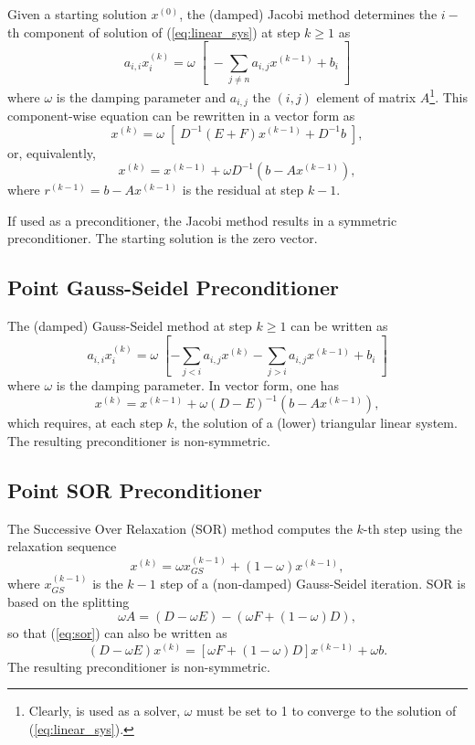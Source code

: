 Given a starting solution $x^{(0)}$, the (damped) Jacobi method determines 
the $i-$th component of 
solution of (\ref{eq:linear_sys}) at step $k \geq 1$ as
\[
a_{i,i} x^{(k)}_i = \omega \; \left[  \;- \sum_{j \neq n} a_{i,j} x^{(k-1)} + b_i
\; \right]
\]
where $\omega$ is the damping parameter and
$a_{i,j}$ the $(i,j)$ element of matrix $A$\footnote{Clearly, is used as a
  solver, $\omega$ must be set to 1 to converge to the solution of
    (\ref{eq:linear_sys}).}.
This component-wise equation can be rewritten in a vector form as
\[
x^{(k)} = \omega \; \left[ \; D^{-1} (E+F) x ^{(k-1)} + D^{-1} b \; \right],
\]
or, equivalently,
\begin{equation}
\label{eq:jacobi}
x^{(k)} = x^{(k-1)} + \omega D^{-1} (b - A x ^{(k-1)} ) ,
\end{equation}
where $r^{(k-1)} = b - A x ^{(k-1)}$ is the residual at step $k-1$. 

If used as a preconditioner, the Jacobi method results in
a symmetric preconditioner.
The starting solution is the zero vector.

\subsection{Point Gauss-Seidel Preconditioner}
\label{sec:gs}

The (damped) Gauss-Seidel method at step $k \geq 1$ can be written as
\[
a_{i,i} x^{(k)}_i = \omega \; 
 \left[- \sum_{j<i} a_{i,j} x^{(k)} 
			   - \sum_{j>i} a_{i,j} x^{(k-1)} + b_i
			   \; \right]
\]
where $\omega$ is the damping parameter. In vector form, one has
\begin{equation}
\label{eq:gs}
x^{(k)} = x^{(k-1)} + \omega (D - E)^{-1} (b - A x ^{(k-1)} ) ,
\end{equation}
which requires, at each step $k$, the solution of a (lower) triangular 
linear system. The resulting preconditioner is non-symmetric.

\subsection{Point SOR Preconditioner}
\label{sec:sor}

The Successive Over Relaxation (SOR) method computes the $k$-th step 
using the relaxation sequence
\begin{equation}
\label{eq:sor}
x^{(k)} = \omega x_{GS}^{(k-1)} + (1 - \omega) x^{(k-1)}, 
\end{equation}
where $x_{GS}^{(k-1)}$ is the $k-1$ step of a (non-damped) Gauss-Seidel
iteration. SOR is based on the splitting 
\[
\omega A = (D - \omega E) - (\omega F + (1 - \omega) D ) ,
\]
so that (\ref{eq:sor}) can also be written as
\[
(D - \omega E) x^{(k)} = \left[
\omega F + (1 - \omega ) D
\right] x^{(k-1)} + \omega b.
\]
The resulting preconditioner is non-symmetric.

